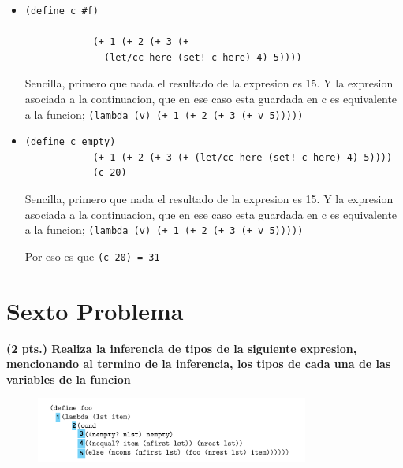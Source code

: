 \documentclass[journal,12pt,onecolumn]{IEEEtran}                %
\theoremstyle{break}                                            %
\begin{document}
      \begin{itemize}
        \item  
          \begin{lstlisting}[gobble=10]
            (define c #f)

            (+ 1 (+ 2 (+ 3 (+ 
              (let/cc here (set! c here) 4) 5))))
          \end{lstlisting}

          Sencilla, primero que nada el resultado de la expresion es 15.
          Y la expresion asociada a la continuacion, que en ese caso esta guardada en c es equivalente a la funcion;
          \texttt{(lambda (v) (+ 1 (+ 2 (+ 3 (+ v 5)))))}

        \item  
          \begin{lstlisting}[gobble=10]
            (define c empty)
            (+ 1 (+ 2 (+ 3 (+ (let/cc here (set! c here) 4) 5))))
            (c 20)
          \end{lstlisting}

          Sencilla, primero que nada el resultado de la expresion es 15.
          Y la expresion asociada a la continuacion, que en ese caso esta guardada en c es equivalente a la funcion;
          \texttt{(lambda (v) (+ 1 (+ 2 (+ 3 (+ v 5)))))}

          Por eso es que \texttt{(c 20) = 31}
      \end{itemize}
    
    \section*{Sexto Problema}

      \textbf{
        (2 pts.)
        Realiza la inferencia de tipos de la siguiente expresion, mencionando al termino de la inferencia, 
        los tipos de cada una de las variables de la funcion}


      \begin{figure}[h]
        \includegraphics[width=0.8\textwidth]{5}
      \end{figure}
\end{document}
